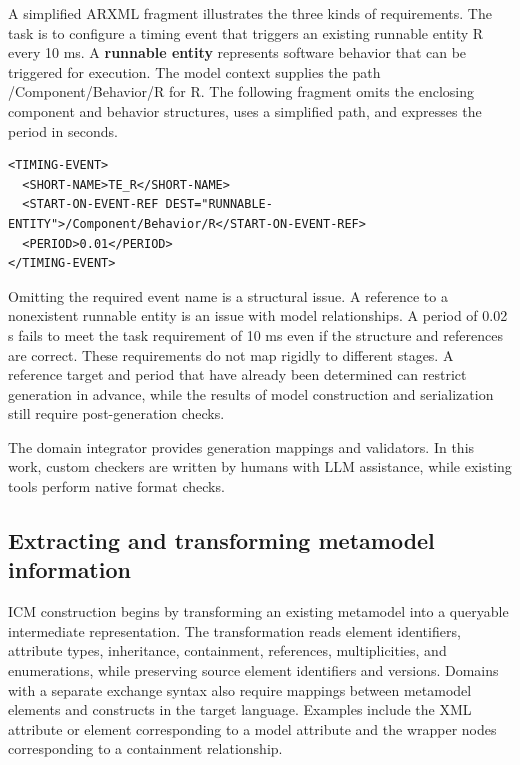 \documentclass[pdflatex,iicol,sn-mathphys-num]{sn-jnl}
\begin{document}
A simplified ARXML fragment illustrates the three kinds of requirements. The task is to configure a timing event that triggers an existing runnable entity R every 10 ms. A \textbf{runnable entity} represents software behavior that can be triggered for execution. The model context supplies the path /Component/Behavior/R for R. The following fragment omits the enclosing component and behavior structures, uses a simplified path, and expresses the period in seconds.


\par\noindent\begin{minipage}{\columnwidth}

\begin{Verbatim}[fontsize=\footnotesize,breaklines=true,breakanywhere=true,breaksymbolleft={},frame=lines,framesep=3mm,rulecolor=\color{lightgray}]
<TIMING-EVENT>
  <SHORT-NAME>TE_R</SHORT-NAME>
  <START-ON-EVENT-REF DEST="RUNNABLE-ENTITY">/Component/Behavior/R</START-ON-EVENT-REF>
  <PERIOD>0.01</PERIOD>
</TIMING-EVENT>
\end{Verbatim}
\end{minipage}\par

Omitting the required event name is a structural issue. A reference to a nonexistent runnable entity is an issue with model relationships. A period of 0.02 s fails to meet the task requirement of 10 ms even if the structure and references are correct. These requirements do not map rigidly to different stages. A reference target and period that have already been determined can restrict generation in advance, while the results of model construction and serialization still require post-generation checks.


The domain integrator provides generation mappings and validators. In this work, custom checkers are written by humans with LLM assistance, while existing tools perform native format checks.


\subsection{Extracting and transforming metamodel information}\label{sec:method-3-2}

ICM construction begins by transforming an existing metamodel into a queryable intermediate representation. The transformation reads element identifiers, attribute types, inheritance, containment, references, multiplicities, and enumerations, while preserving source element identifiers and versions. Domains with a separate exchange syntax also require mappings between metamodel elements and constructs in the target language. Examples include the XML attribute or element corresponding to a model attribute and the wrapper nodes corresponding to a containment relationship.
\end{document}

